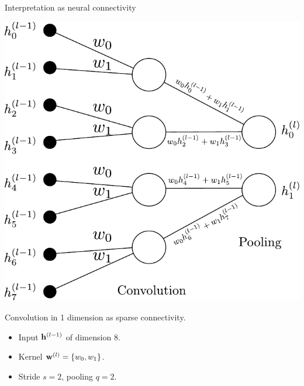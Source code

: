 \documentclass{beamer}
\begin{document}
\begin{frame}{Interpretation as neural connectivity}
\begin{multicols}{2}
    
\begin{center}
    \includegraphics[scale=0.4]{Module 4 (CNN)/pics/Conv_sparse_rep.pdf}\\
    \begin{tiny}Convolution in 1 dimension as sparse connectivity.\end{tiny} 
\end{center}


\begin{itemize}
\item Input ${\bf h}^{(l-1)}$  of dimension 8.
\item Kernel ${\bf w}^{(l)}=\{w_0, w_1\}$. 
\item Stride $s=2$, pooling  $q=2$. 
\end{itemize}

\columnbreak


\end{multicols}
\end{frame}
\end{document}
